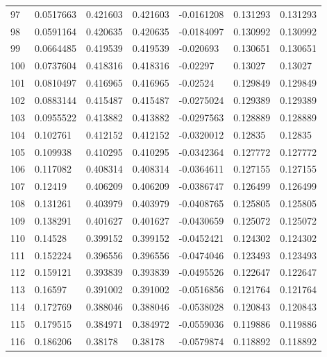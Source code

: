 \begin{longtable}{l|lll|lll}
  97 &  0.0517663   & 0.421603    & 0.421603    & -0.0161208   & 0.131293    & 0.131293    \\
  98 &  0.0591164   & 0.420635    & 0.420635    & -0.0184097   & 0.130992    & 0.130992    \\
  99 &  0.0664485   & 0.419539    & 0.419539    & -0.020693    & 0.130651    & 0.130651    \\
 100 &  0.0737604   & 0.418316    & 0.418316    & -0.02297     & 0.13027     & 0.13027     \\
 101 &  0.0810497   & 0.416965    & 0.416965    & -0.02524     & 0.129849    & 0.129849    \\
 102 &  0.0883144   & 0.415487    & 0.415487    & -0.0275024   & 0.129389    & 0.129389    \\
 103 &  0.0955522   & 0.413882    & 0.413882    & -0.0297563   & 0.128889    & 0.128889    \\
 104 &  0.102761    & 0.412152    & 0.412152    & -0.0320012   & 0.12835     & 0.12835     \\
 105 &  0.109938    & 0.410295    & 0.410295    & -0.0342364   & 0.127772    & 0.127772    \\
 106 &  0.117082    & 0.408314    & 0.408314    & -0.0364611   & 0.127155    & 0.127155    \\
 107 &  0.12419     & 0.406209    & 0.406209    & -0.0386747   & 0.126499    & 0.126499    \\
 108 &  0.131261    & 0.403979    & 0.403979    & -0.0408765   & 0.125805    & 0.125805    \\
 109 &  0.138291    & 0.401627    & 0.401627    & -0.0430659   & 0.125072    & 0.125072    \\
 110 &  0.14528     & 0.399152    & 0.399152    & -0.0452421   & 0.124302    & 0.124302    \\
 111 &  0.152224    & 0.396556    & 0.396556    & -0.0474046   & 0.123493    & 0.123493    \\
 112 &  0.159121    & 0.393839    & 0.393839    & -0.0495526   & 0.122647    & 0.122647    \\
 113 &  0.16597     & 0.391002    & 0.391002    & -0.0516856   & 0.121764    & 0.121764    \\
 114 &  0.172769    & 0.388046    & 0.388046    & -0.0538028   & 0.120843    & 0.120843    \\
 115 &  0.179515    & 0.384971    & 0.384972    & -0.0559036   & 0.119886    & 0.119886    \\
 116 &  0.186206    & 0.38178     & 0.38178     & -0.0579874   & 0.118892    & 0.118892    \\

\end{longtable}
